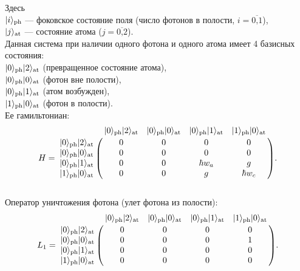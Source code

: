 \noindent Здесь\\
\indent\qquad $|i\rangle_{\text{ph}}$ --- фоковское состояние поля (число фотонов в полости, $i=\overline{\mbox{0,1}}$),\\
\indent\qquad $|j\rangle_{\text{at}}$ --- состояние атома ($j=\overline{\mbox{0,2}}$).
\\[18pt]
\noindent Данная система при наличии одного фотона и одного атома имеет 4 базисных состояния:\\
\indent\qquad $|0\rangle_{\text{\text{ph}}}|2\rangle_{\text{\text{at}}}$ (превращенное состояние атома),\\
\indent\qquad $|0\rangle_{\text{\text{ph}}}|0\rangle_{\text{\text{at}}}$ (фотон вне полости),\\
\indent\qquad $|0\rangle_{\text{\text{ph}}}|1\rangle_{\text{\text{at}}}$ (атом возбужден),\\
\indent\qquad $|1\rangle_{\text{\text{ph}}}|0\rangle_{\text{\text{at}}}$ (фотон в полости).
\\[12pt]

\noindent Ее гамильтониан:\\
{\normalsize
\begin{equation}\label{ch:H}
	H = \bordermatrix
	{
		&                |0\ra_{\text{\text{ph}}}|2\ra_{\text{\text{at}}} & |0\ra_{\text{\text{ph}}}|0\ra_{\text{\text{at}}} & |0\ra_{\text{\text{ph}}}|1\ra_{\text{\text{at}}} & |1\ra_{\text{\text{ph}}}|0\ra_{\text{\text{at}}} \cr
		|0\ra_{\text{\text{ph}}}|2\ra_{\text{\text{at}}} &      0 &       	   0 &      0 & 0 \cr
		|0\ra_{\text{\text{ph}}}|0\ra_{\text{\text{at}}} &      0 &       	   0 &      0 & 0\cr
		|0\ra_{\text{\text{ph}}}|1\ra_{\text{\text{at}}} &      0 &  		   0 &      \hbar w_{a} & g\cr
		|1\ra_{\text{\text{ph}}}|0\ra_{\text{\text{at}}} &      0 &      	   0 &      g & \hbar w_{c}\cr
	}.
\end{equation}
}
\
\\[18pt]

\noindent Оператор уничтожения фотона (улет фотона из полости):\\
{\normalsize
\begin{equation}\label{ch:L1}
	L_{1} = \bordermatrix
	{
		&                |0\ra_{\text{\text{ph}}}|2\ra_{\text{\text{at}}} & |0\ra_{\text{\text{ph}}}|0\ra_{\text{\text{at}}} & |0\ra_{\text{\text{ph}}}|1\ra_{\text{\text{at}}} & |1\ra_{\text{\text{ph}}}|0\ra_{\text{\text{at}}} \cr
		|0\ra_{\text{\text{ph}}}|2\ra_{\text{\text{at}}} &      0 &      0 &      0 & 0 \cr
		|0\ra_{\text{\text{ph}}}|0\ra_{\text{\text{at}}} &      0 &      0 &      0 & 1\cr
		|0\ra_{\text{\text{ph}}}|1\ra_{\text{\text{at}}} &      0 &      0 &      0 & 0\cr
		|1\ra_{\text{\text{ph}}}|0\ra_{\text{\text{at}}} &      0 &      0 &      0 & 0\cr
	}.
\end{equation}
}
\\

